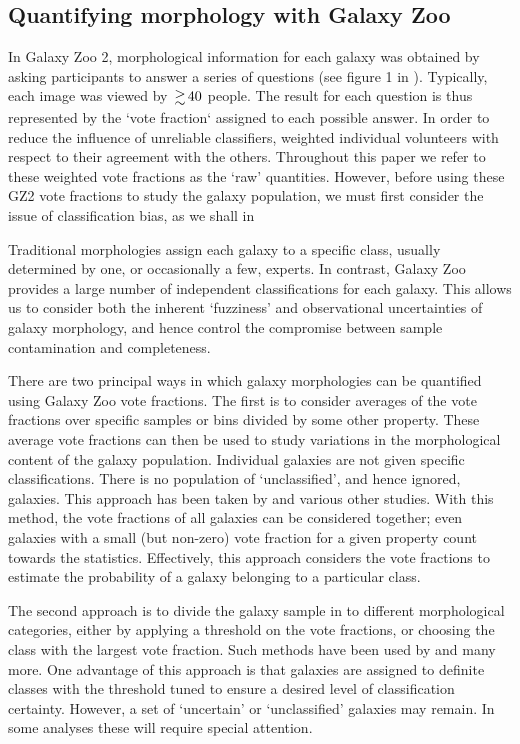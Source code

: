 \documentclass[useAMS,usenatbib]{mn2e}
\begin{document}
\subsection{Quantifying morphology with Galaxy Zoo}
\label{sec:comparison_methods}

In Galaxy Zoo 2, morphological information for each galaxy was obtained by asking participants to answer a series of questions (see figure 1 in \citealt{Willett_13}).  Typically, each image was viewed by $\ga 40$ people.  The result for each question is thus represented by the `vote fraction` assigned to each possible answer.  In order to reduce the influence of unreliable classifiers, \citet{Willett_13} weighted individual volunteers with respect to their agreement with the others.  Throughout this paper we refer to these weighted vote fractions as the `raw' quantities. However, before using these GZ2 vote fractions to study the galaxy population, we must first consider the issue of classification bias, as we shall in

Traditional morphologies assign each galaxy to a specific class, usually determined by one, or occasionally a few, experts. In contrast, Galaxy Zoo provides a large number of independent classifications for each galaxy.  This allows us to consider both the inherent `fuzziness' and observational uncertainties of galaxy morphology, and hence control the compromise between sample contamination and completeness.

There are two principal ways in which galaxy morphologies can be quantified using Galaxy Zoo vote fractions. The first is to consider averages of the vote fractions over specific samples or bins divided by some other property.  These average vote fractions can then be used to study variations in the morphological content of the galaxy population.  Individual galaxies are not given specific classifications.  There is no population of `unclassified', and hence ignored, galaxies.  This approach has been taken by \citet{Bamford_09,Casteels_13,Willett_15} and various other studies. With this method, the vote fractions of all galaxies can be considered together; even galaxies with a small (but non-zero) vote fraction for a given property count towards the statistics. Effectively, this approach considers the vote fractions to estimate the probability of a galaxy belonging to a particular class.

The second approach is to divide the galaxy sample in to different morphological categories, either by applying a threshold on the vote fractions, or choosing the class with the largest vote fraction. Such methods have been used by \citep{Land_08,Skibba_09,Smethurst_15} and many more.  One advantage of this approach is that galaxies are assigned to definite classes with the threshold tuned to ensure a desired level of classification certainty.  However, a set of `uncertain' or `unclassified' galaxies may remain.  In some analyses these will require special attention.
\end{document}
